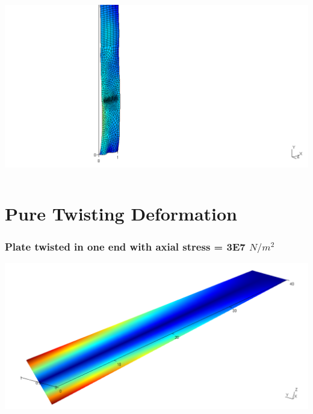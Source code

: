 \documentclass[9pt]{beamer}
\begin{document}
\begin{frame}
\begin{columns}

\href{run:RandomLoad/Dynamic_Rad1.mpg}{\includegraphics[width=1.0\textwidth,trim={11cm 0cm 22cm 0cm},clip]{RandomLoad/Dynamic_Rad1.png}}
\end{columns}
\end{frame}

\section{Pure Twisting Deformation}

\begin{frame}
\frametitle{Plate twisted in one end with axial stress = 3E7 $N/m^2$  }


\href{run:N2/3E7/Dynamic.mpg}{\includegraphics[width=\linewidth,trim={0cm 0cm 0cm 0cm},clip]{N2/0E1/static.png}}
\end{frame}
\end{document}
